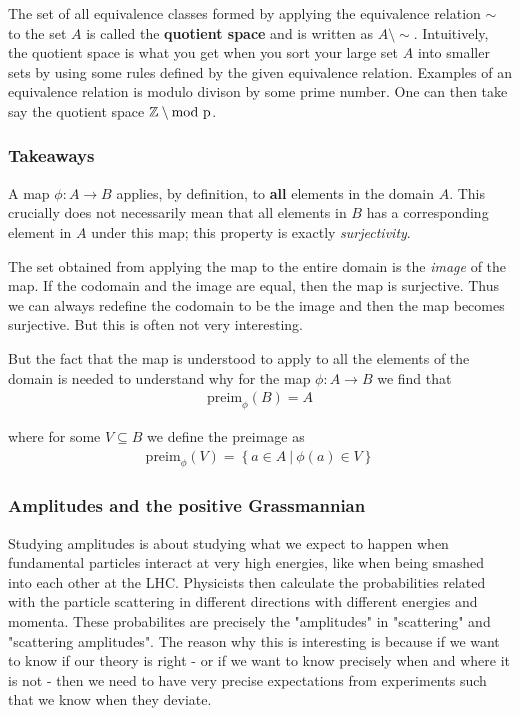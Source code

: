 \begin{deff}
    The set of all equivalence classes formed by applying the equivalence relation \(\sim\) to the set \(A\) is called the \textbf{quotient space} and is written as \(A\setminus\sim\). Intuitively, the quotient space is what you get when you sort your large set \(A\) into smaller sets by using some rules defined by the given equivalence relation. Examples of an equivalence relation is modulo divison by some prime number. One can then take say the quotient space \(\mathbb{Z} \setminus \rm{mod}\ p\).
\end{deff}
\subsubsection*{Takeaways}
A map \(\phi : A \to B\) applies, by definition, to \textbf{all} elements in the domain \(A\). This crucially does not necessarily mean that all elements in \(B\) has a corresponding element in \(A\) under this map; this property is exactly \textit{surjectivity}. 

The set obtained from applying the map to the entire domain is the \textit{image} of the map. If the codomain and the image are equal, then the map is surjective. Thus we can always redefine the codomain to be the image and then the map becomes surjective. But this is often not very interesting.

But the fact that the map is understood to apply to all the elements of the domain is needed to understand why for the map \(\phi : A \to B\) we find that \begin{align*}
    \text{preim}_{\phi}(B) = A 
\end{align*} 

where for some \(V \subseteq B\) we define the preimage as \begin{align*}
    \text{preim}_{\phi}(V) = \left\{ a \in A\ |\ \phi (a) \in V \right\}  
\end{align*} 

\subsubsection*{Amplitudes and the positive Grassmannian}
Studying amplitudes is about studying what we expect to happen when fundamental particles interact at very high energies, like when being smashed into each other at the LHC. Physicists then calculate the probabilities related with the particle scattering in different directions with different energies and momenta. These probabilites are precisely the "amplitudes" in "scattering" and "scattering amplitudes". The reason why this is interesting is because if we want to know if our theory is right - or if we want to know precisely when and where it is not - then we need to have very precise expectations from experiments such that we know when they deviate. 

